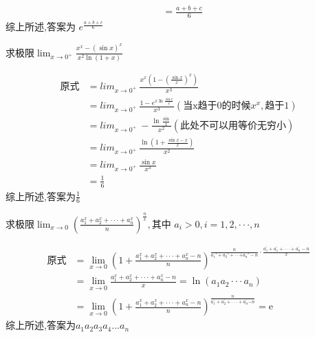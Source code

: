 \documentclass[12pt, a4paper, oneside, UTF8]{ctexbook}
\begin{document}
\begin{sloppypar}
\begin{solution}
\begin{align*}
                                & = \frac{a+b+c}{6}
                  \end{align*}
                  综上所述,答案为  $e^{\frac{a+b+c}{6}}$
              \end{solution}
              \begin{problem}
              求极限$\operatorname*{lim}_{x\to0^+}\frac{x^{x}-(\sin x)^{x}}{x^{2}\ln(1+x)}$
              \end{problem}
              \begin{solution}
                  \begin{align*}
                      \text{原式} & = {lim}_{x\to0^+}\ \frac{x^x (1-(\frac{\sin x}{x})^x)}{x^3}                               \\
                                & = {lim}_{x\to0^+}\ \frac{1-e^{x\ln \frac{\sin x}{x}}}{x^3}(\text{当x趋于0的时候}x^x,\text{趋于1}) \\
                                & = {lim}_{x\to0^+}\ - \frac{\ln \frac{\sin}{x}}{x^2} (\text{此处不可以用等价无穷小})                  \\
                                & = {lim}_{x\to0^+}\ \frac{\ln (1+\frac{\sin x - x}{x})}{x^2}                               \\
                                & = {lim}_{x\to0^+}\ \frac{\sin x}{x^3}                                                     \\
                                & = \frac{1}{6}
                  \end{align*}
                  综上所述,答案为$\frac{1}{6}$
              \end{solution}
              \begin{problem}
              $\text{求极限}\lim_{x\to0}\left(\frac{a_1^x+a_2^x+\cdotp\cdotp\cdotp+a_n^x}n\right)^{\frac nx},\text{其中 }a_i>0,i=1,2,\cdotp\cdotp\cdotp,n$
              \end{problem}
              \begin{solution}
                  \begin{align*}
                      \text{原式} & = \lim_{x\to0}\left(1+\frac{a_1^x+a_2^x+\cdotp\cdotp\cdotp+a_n^x-n}n\right)^{\frac n{a_1'+a_2'+\cdotp\cdotp+a_n'-n}\cdot\frac{a_1^{\prime}+a_1^{\prime}+\cdotp\cdotp\cdotp+a_n^{\prime}-n}x} \\
                                & = \lim_{x\to0}\frac{a_1^x+a_2^x+\cdotp\cdotp\cdotp+a_n^x-n}x=\ln(a_1a_2\cdotp\cdotp\cdotp a_n)                                                                                               \\
                                & = \lim_{x\to0}\left(1+\frac{a_1^x+a_2^x+\cdot\cdot\cdot+a_n^x-n}n\right)^{\frac n{a_1^{\prime}+a_2^{\prime}+\cdot\cdot\cdot+a_n^{\prime}{-n}}}=\mathrm{e}
                  \end{align*}
                  综上所述,答案为$a_1a_2a_3a_4...a_n$
              \end{solution}

\end{sloppypar}
\end{document}
